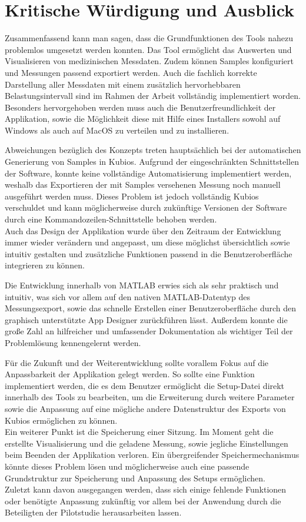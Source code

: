 
\chapter{Kritische Würdigung und Ausblick}

Zusammenfassend kann man sagen, dass die Grundfunktionen des Tools nahezu problemlos umgesetzt werden konnten. Das Tool ermöglicht das Auswerten und Visualisieren von medizinischen Messdaten. Zudem können Samples konfiguriert und Messungen passend exportiert werden. Auch die fachlich korrekte Darstellung aller Messdaten mit einem zusätzlich hervorhebbaren Belastungsintervall sind im Rahmen der Arbeit vollständig implementiert worden.\\
Besonders hervorgehoben werden muss auch die Benutzerfreundlichkeit der Applikation, sowie die Möglichkeit diese mit Hilfe eines Installers sowohl auf Windows als auch auf MacOS zu verteilen und zu installieren.

Abweichungen bezüglich des Konzepts treten hauptsächlich bei der automatischen Generierung von Samples in Kubios. Aufgrund der eingeschränkten Schnittstellen der Software, konnte keine vollständige Automatisierung implementiert werden, weshalb das Exportieren der mit Samples versehenen Messung noch manuell ausgeführt werden muss. Dieses Problem ist jedoch vollständig Kubios verschuldet und kann möglicherweise durch zukünftige Versionen der Software durch eine Kommandozeilen-Schnittstelle behoben werden.\\
Auch das Design der Applikation wurde über den Zeitraum der Entwicklung immer wieder verändern und angepasst, um diese möglichst übersichtlich sowie intuitiv gestalten und zusätzliche Funktionen passend in die Benutzeroberfläche integrieren zu können.

Die Entwicklung innerhalb von MATLAB erwies sich als sehr praktisch und intuitiv, was sich vor allem auf den nativen MATLAB-Datentyp des Messungsexport, sowie das schnelle Erstellen einer Benutzeroberfläche durch den graphisch unterstützte App Designer zurückführen lässt. Außerdem konnte die große Zahl an hilfreicher und umfassender Dokumentation als wichtiger Teil der Problemlösung kennengelernt werden.

Für die Zukunft und der Weiterentwicklung sollte vorallem Fokus auf die Anpassbarkeit der Applikation gelegt werden. So sollte eine Funktion implementiert werden, die es dem Benutzer ermöglicht die Setup-Datei direkt innerhalb des Tools zu bearbeiten, um die Erweiterung durch weitere Parameter sowie die Anpassung auf eine mögliche andere Datenstruktur des Exports von Kubios ermöglichen zu können.\\
Ein weiterer Punkt ist die Speicherung einer Sitzung. Im Moment geht die erstellte Visualisierung und die geladene Messung, sowie jegliche Einstellungen beim Beenden der Applikation verloren. Ein übergreifender Speichermechanismus könnte dieses Problem lösen und möglicherweise auch eine passende Grundstruktur zur Speicherung und Anpassung des Setups ermöglichen.\\
Zuletzt kann davon ausgegangen werden, dass sich einige fehlende Funktionen oder benötigte Anpassung zukünftig vor allem bei der Anwendung durch die Beteiligten der Pilotstudie herausarbeiten lassen.